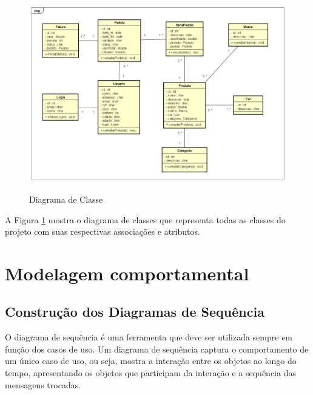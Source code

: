 \begin{figure}[H]
    \centering
    \caption{Diagrama de Classe}
    \includegraphics[width=1.0\textwidth]{./dados/figuras/5}
    \label{fig:figura-5}
\end{figure}

A Figura \ref{fig:figura-5} mostra o diagrama de classes que representa todas as classes do projeto com suas respectivas associações e atributos.


\section{Modelagem comportamental}
\label{sec:modcom}

\subsection{Construção dos Diagramas de Sequência}
\label{sec:conseq}
O diagrama de sequência é uma ferramenta que deve ser utilizada sempre em  função dos casos de uso. Um diagrama de sequência captura o comportamento de  um único caso de uso, ou seja, mostra a interação entre os objetos ao longo  do tempo, apresentando os objetos que participam da interação e a sequência das mensagens trocadas. \cite{Atividade}

